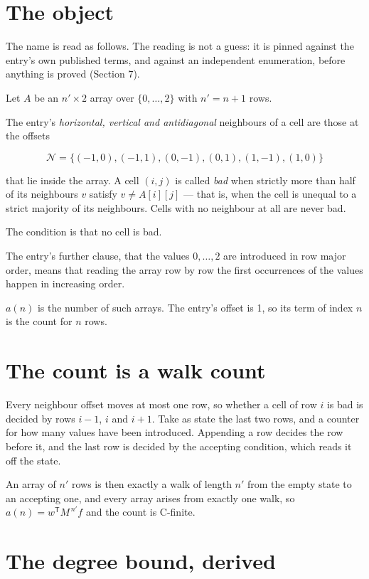 \documentclass[11pt]{article}
\theoremstyle{definition}
\begin{document}
\section{The object}

The name is read as follows. The reading is not a guess: it is pinned against the entry's own published terms, and against an independent enumeration, before anything is proved (Section 7).

Let $A$ be an $n' \times 2$ array over $\{0,\dots,2\}$ with $n' = n + 1$ rows.

The entry's {\itshape horizontal, vertical and antidiagonal} neighbours of a cell are those at the offsets

\[\mathcal{N} = \{(-1,0), (-1,1), (0,-1), (0,1), (1,-1), (1,0)\}\]

that lie inside the array. A cell $(i,j)$ is called {\itshape bad} when strictly more than half of its neighbours $v$ satisfy $v \ne A[i][j]$ --- that is, when the cell is unequal to a strict majority of its neighbours. Cells with no neighbour at all are never bad.

The condition is that no cell is bad.

The entry's further clause, that the values $0,\dots,2$ are introduced in row major order, means that reading the array row by row the first occurrences of the values happen in increasing order.

$a(n)$ is the number of such arrays. The entry's offset is 1, so its term of index $n$ is the count for $n$ rows.

\section{The count is a walk count}

Every neighbour offset moves at most one row, so whether a cell of row $i$ is bad is decided by rows $i-1$, $i$ and $i+1$. Take as state the last two rows, and a counter for how many values have been introduced. Appending a row decides the row before it, and the last row is decided by the accepting condition, which reads it off the state.

An array of $n'$ rows is then exactly a walk of length $n'$ from the empty state to an accepting one, and every array arises from exactly one walk, so $a(n) = w^{\mathsf T}M^{\,n'}f$ and the count is C-finite.

\section{The degree bound, derived}
\end{document}
